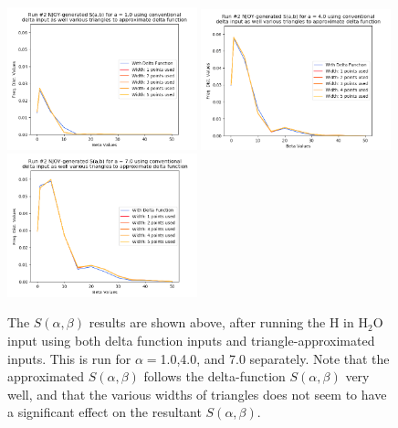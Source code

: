 \documentclass[a4paper]{article}
\begin{document}
\begin{figure}
\centering
\includegraphics[width=0.49\textwidth]{run2_sab_alpha_equals_1.png}
\includegraphics[width=0.49\textwidth]{run2_sab_alpha_equals_4.png}
\includegraphics[width=0.49\textwidth]{run2_sab_alpha_equals_7.png}
\caption{\label{fig:run2_comparing_sab_values} The $S(\alpha,\beta)$ results are shown above, after running the H in H$_2$O input using both delta function inputs and triangle-approximated inputs. This is run for $\alpha=$1.0,4.0, and 7.0 separately. Note that the approximated $S(\alpha,\beta)$ follows the delta-function $S(\alpha,\beta)$ very well, and that the various widths of triangles does not seem to have a significant effect on the resultant $S(\alpha,\beta)$.}
\end{figure}



\newpage
\end{document}
